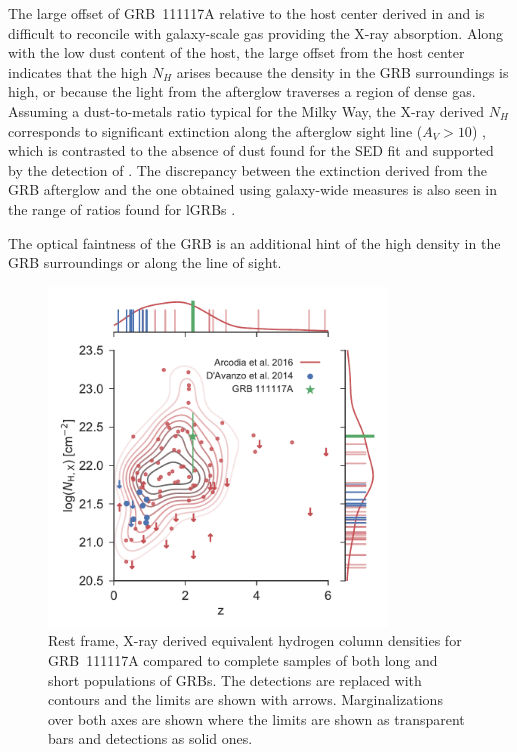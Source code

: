 \documentclass{aa}    %
\begin{document}
The large offset of GRB~111117A relative to the host center derived in
\citet{Margutti2012} and \citet{Sakamoto2013} is difficult to reconcile with
galaxy-scale gas providing the X-ray absorption. Along with the low dust content
of the host, the large offset from the host center indicates that the high $N_H$
arises because the density in the GRB surroundings is high, or because the light
from the afterglow traverses a region of dense gas. Assuming a dust-to-metals
ratio typical for the Milky Way, the X-ray derived $N_H$ corresponds to
significant extinction along the afterglow sight line ($A_V > 10$)
\citep{Predehl1995}, which is contrasted to the absence of dust found for the
SED fit and supported by the detection of \lya{}. The discrepancy between the extinction derived from the GRB afterglow
and the one obtained using galaxy-wide measures is also seen in the range of
ratios found for lGRBs \citep{Perley2013a, Covino2013}.

The optical faintness of the
GRB is an additional hint of the high density in the GRB surroundings or along
the line of sight. 


\begin{figure}
	\centering
	\includegraphics[width=9cm]{figures/NH_z.pdf}
	\caption{Rest frame, X-ray derived equivalent hydrogen column densities for GRB~111117A compared to complete samples of both long and short populations of GRBs. The detections are replaced with contours and the limits are shown with arrows. Marginalizations over both axes are shown where the limits are shown as transparent bars and detections as solid ones.}
	\label{fig:NH_z}
\end{figure}

\end{document}

